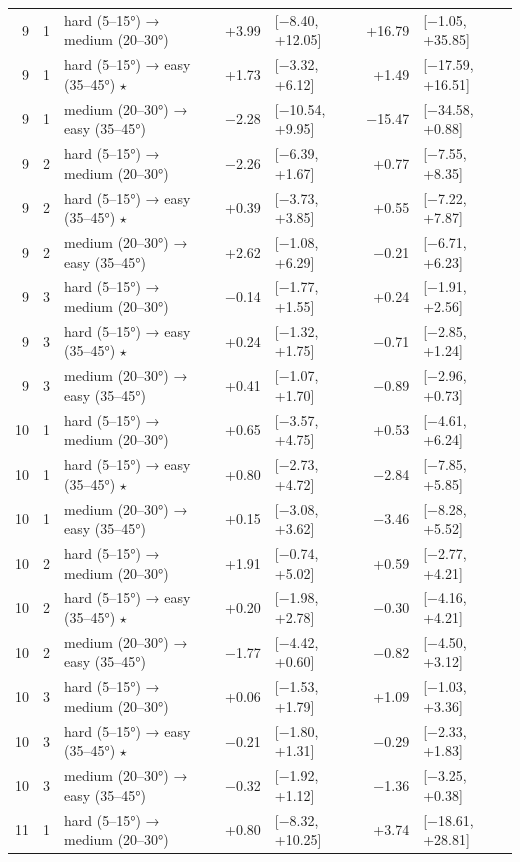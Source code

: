 \begin{table}[htbp]
\begin{tabular}{rllrlrl}
    9 & 1 & hard (5–15°) → medium (20–30°) & +3.99 & [−8.40, +12.05] & +16.79 & [−1.05, +35.85] \\
    9 & 1 & hard (5–15°) → easy (35–45°) $\star$ & +1.73 & [−3.32, +6.12] & +1.49 & [−17.59, +16.51] \\
    9 & 1 & medium (20–30°) → easy (35–45°) & −2.28 & [−10.54, +9.95] & −15.47 & [−34.58, +0.88] \\
    9 & 2 & hard (5–15°) → medium (20–30°) & −2.26 & [−6.39, +1.67] & +0.77 & [−7.55, +8.35] \\
    9 & 2 & hard (5–15°) → easy (35–45°) $\star$ & +0.39 & [−3.73, +3.85] & +0.55 & [−7.22, +7.87] \\
    9 & 2 & medium (20–30°) → easy (35–45°) & +2.62 & [−1.08, +6.29] & −0.21 & [−6.71, +6.23] \\
    9 & 3 & hard (5–15°) → medium (20–30°) & −0.14 & [−1.77, +1.55] & +0.24 & [−1.91, +2.56] \\
    9 & 3 & hard (5–15°) → easy (35–45°) $\star$ & +0.24 & [−1.32, +1.75] & −0.71 & [−2.85, +1.24] \\
    9 & 3 & medium (20–30°) → easy (35–45°) & +0.41 & [−1.07, +1.70] & −0.89 & [−2.96, +0.73] \\
    10 & 1 & hard (5–15°) → medium (20–30°) & +0.65 & [−3.57, +4.75] & +0.53 & [−4.61, +6.24] \\
    10 & 1 & hard (5–15°) → easy (35–45°) $\star$ & +0.80 & [−2.73, +4.72] & −2.84 & [−7.85, +5.85] \\
    10 & 1 & medium (20–30°) → easy (35–45°) & +0.15 & [−3.08, +3.62] & −3.46 & [−8.28, +5.52] \\
    10 & 2 & hard (5–15°) → medium (20–30°) & +1.91 & [−0.74, +5.02] & +0.59 & [−2.77, +4.21] \\
    10 & 2 & hard (5–15°) → easy (35–45°) $\star$ & +0.20 & [−1.98, +2.78] & −0.30 & [−4.16, +4.21] \\
    10 & 2 & medium (20–30°) → easy (35–45°) & −1.77 & [−4.42, +0.60] & −0.82 & [−4.50, +3.12] \\
    10 & 3 & hard (5–15°) → medium (20–30°) & +0.06 & [−1.53, +1.79] & +1.09 & [−1.03, +3.36] \\
    10 & 3 & hard (5–15°) → easy (35–45°) $\star$ & −0.21 & [−1.80, +1.31] & −0.29 & [−2.33, +1.83] \\
    10 & 3 & medium (20–30°) → easy (35–45°) & −0.32 & [−1.92, +1.12] & −1.36 & [−3.25, +0.38] \\
    11 & 1 & hard (5–15°) → medium (20–30°) & +0.80 & [−8.32, +10.25] & +3.74 & [−18.61, +28.81] \\

\end{tabular}
\end{table}
